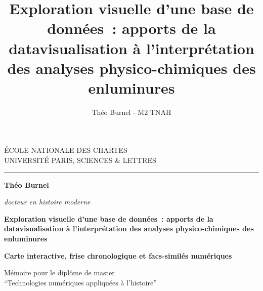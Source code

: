 \documentclass[a4paper,12pt,twoside]{book}
\author{Théo Burnel - M2 TNAH}
\title{Exploration visuelle d'une base de données~: apports de la datavisualisation à l’interprétation des analyses physico-chimiques des enluminures}
\begin{document}
	\begin{titlepage}
		\begin{center}
			
			\bigskip
			
			\begin{large}				
				ÉCOLE NATIONALE DES CHARTES\\
				UNIVERSITÉ PARIS, SCIENCES \& LETTRES
			\end{large}
			\begin{center}\rule{2cm}{0.02cm}\end{center}
			
			\bigskip
			\bigskip
			\bigskip
			\begin{Large}
				\textbf{Théo Burnel}\\
			\end{Large}
			\begin{normalsize} \textit{docteur en histoire moderne}\\
			\end{normalsize}
			
			\bigskip
			\bigskip
			\bigskip
			
			\begin{Huge}
				\textbf{Exploration visuelle d'une base de données~: apports de la datavisualisation à l’interprétation des analyses physico-chimiques des enluminures}\\
			\end{Huge}
			\bigskip
			\bigskip
			\begin{LARGE}
				\textbf{Carte interactive, frise chronologique et facs-similés numériques}\\
			\end{LARGE}
			
			\bigskip
			\bigskip
			\bigskip
			\begin{large}
			\end{large}
			\vfill
			
			\begin{large}
				Mémoire 
				pour le diplôme de master \\
				\enquote{Technologies numériques appliquées à l'histoire} \\
			\end{large}
			
		\end{center}
	\end{titlepage}
	
	\thispagestyle{empty}	
	\cleardoublepage
	
	\frontmatter
	
\end{document}
